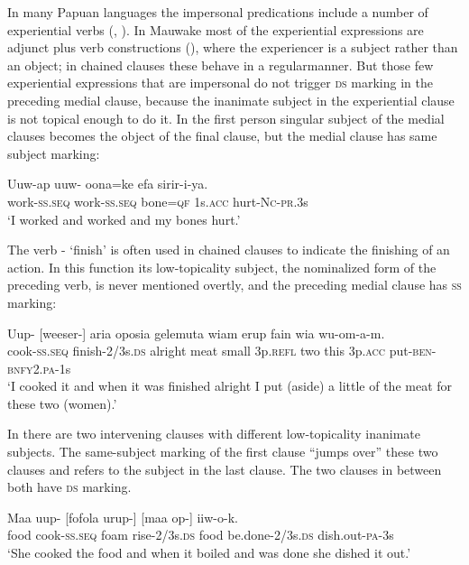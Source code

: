 In many Papuan languages the impersonal predications include a number of experiential verbs (\citealt[204]{Reesink1987}, \citealt{Roberts1997}). In Mauwake most of the experiential expressions are adjunct plus verb constructions (), where the experiencer is a subject rather than an object; in chained clauses these behave in a regular\textstyleAcronymallcaps manner. But those few experiential expressions that are impersonal do not trigger \textsc{ds} marking in the preceding medial clause, because the inanimate subject in the experiential clause is not topical enough to do it. In  the first person singular subject of the medial clauses becomes the object of the final clause, but the medial clause has same subject marking:

\ea%
\label{ex:8:x1491}
\gll Uuw-ap uuw- oona=ke efa  sirir-i-ya.\\
work-\textsc{ss}.\textsc{seq} work-\textsc{ss}.\textsc{seq} bone=\textsc{qf} 1s.\textsc{acc} hurt-\textsc{Nc}-\textsc{pr}.3s\\
\glt`I worked and worked and my bones hurt.'
\z


The verb - `finish' is often used in chained clauses to indicate the finishing of an action. In this function its low-topicality subject, the nominalized form of the preceding verb, is never mentioned overtly, and the preceding medial clause has \textsc{ss} marking:

\ea%
\label{ex:8:x1483}
\gll Uup-  [weeser-]  aria  oposia  gelemuta  wiam  erup fain  wia  wu-om-a-m.\\
cook-\textsc{ss}.\textsc{seq} finish-2/3s.\textsc{ds} alright  meat  small  3p.\textsc{refl} two this 3p.\textsc{acc} put-\textsc{ben}-\textsc{bnfy}2.\textsc{pa}-1s     \\
\glt`I cooked it and when it was finished alright I put (aside) a little of the meat for these two (women).'
\z


In  there are two intervening clauses with different low-topicality inanimate subjects. The same-subject marking of the first clause ``jumps over'' these two clauses and refers to the subject in the last clause. The two clauses in between both have \textsc{ds} marking. 

\ea%
\label{ex:8:x1476}
\gll Maa  uup- \textstyleEmphasizedVernacularWords{} [fofola  urup-]  [maa  op-] iiw-o-k.\\
food  cook-\textsc{ss}.\textsc{seq} foam rise-2/3s.\textsc{ds} food  be.done-2/3s.\textsc{ds} dish.out-\textsc{pa}-3s\hspace{-1mm}\\
\glt`She cooked the food and when it boiled and was done she dished it out.'
\z


